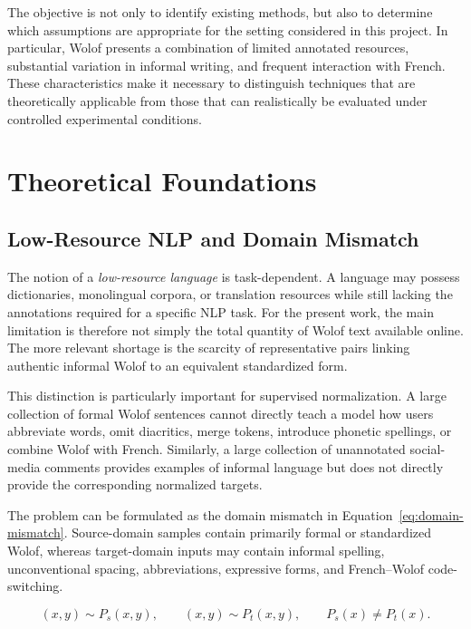 \documentclass[12pt, a4paper, twoside, openany]{report}
\begin{document}
The objective is not only to identify existing methods, but also to determine which assumptions are appropriate for the setting considered in this project. In particular, Wolof presents a combination of limited annotated resources, substantial variation in informal writing, and frequent interaction with French. These characteristics make it necessary to distinguish techniques that are theoretically applicable from those that can realistically be evaluated under controlled experimental conditions.


\section{Theoretical Foundations}

\subsection{Low-Resource NLP and Domain Mismatch}

The notion of a \emph{low-resource language} is task-dependent. A language may possess dictionaries, monolingual corpora, or translation resources while still lacking the annotations required for a specific \ac{NLP} task. For the present work, the main limitation is therefore not simply the total quantity of Wolof text available online. The more relevant shortage is the scarcity of representative pairs linking authentic informal Wolof to an equivalent standardized form.

This distinction is particularly important for supervised normalization. A large collection of formal Wolof sentences cannot directly teach a model how users abbreviate words, omit diacritics, merge tokens, introduce phonetic spellings, or combine Wolof with French. Similarly, a large collection of unannotated social-media comments provides examples of informal language but does not directly provide the corresponding normalized targets.

The problem can be formulated as the domain mismatch in Equation~\eqref{eq:domain-mismatch}. Source-domain samples contain primarily formal or standardized Wolof, whereas target-domain inputs may contain informal spelling, unconventional spacing, abbreviations, expressive forms, and French--Wolof code-switching.

\begin{equation}
	(x,y) \sim P_s(x,y),\qquad
	(x,y) \sim P_t(x,y),\qquad
	P_s(x) \neq P_t(x).
	\label{eq:domain-mismatch}
\end{equation}
\end{document}
